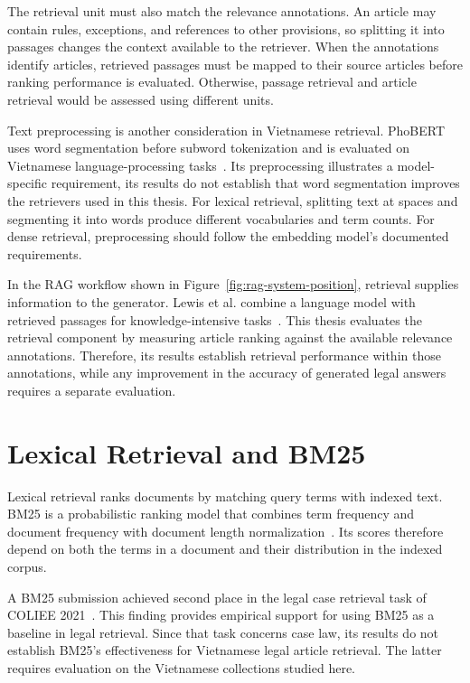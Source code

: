The retrieval unit must also match the relevance annotations. An article may contain rules, exceptions, and references to other provisions, so splitting it into passages changes the context available to the retriever. When the annotations identify articles, retrieved passages must be mapped to their source articles before ranking performance is evaluated. Otherwise, passage retrieval and article retrieval would be assessed using different units.

Text preprocessing is another consideration in Vietnamese retrieval. PhoBERT uses word segmentation before subword tokenization and is evaluated on Vietnamese language-processing tasks~\cite{nguyen2020}. Its preprocessing illustrates a model-specific requirement, its results do not establish that word segmentation improves the retrievers used in this thesis. For lexical retrieval, splitting text at spaces and segmenting it into words produce different vocabularies and term counts. For dense retrieval, preprocessing should follow the embedding model's documented requirements.

In the RAG workflow shown in Figure~\ref{fig:rag-system-position}, retrieval supplies information to the generator. Lewis et al. combine a language model with retrieved passages for knowledge-intensive tasks~\cite{lewis2020}. This thesis evaluates the retrieval component by measuring article ranking against the available relevance annotations. Therefore, its results establish retrieval performance within those annotations, while any improvement in the accuracy of generated legal answers requires a separate evaluation.

\section{Lexical Retrieval and BM25}

Lexical retrieval ranks documents by matching query terms with indexed text. BM25 is a probabilistic ranking model that combines term frequency and document frequency with document length normalization~\cite{robertson2009}. Its scores therefore depend on both the terms in a document and their distribution in the indexed corpus.

A BM25 submission achieved second place in the legal case retrieval task of COLIEE 2021~\cite{rosa2021}. This finding provides empirical support for using BM25 as a baseline in legal retrieval. Since that task concerns case law, its results do not establish BM25's effectiveness for Vietnamese legal article retrieval. The latter requires evaluation on the Vietnamese collections studied here.

